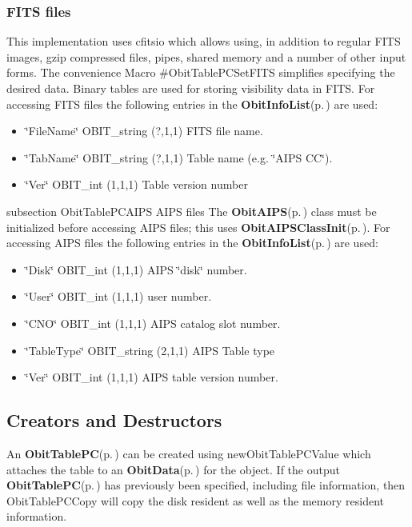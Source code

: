 \subsubsection{FITS files}\label{ObitTableWX_8h_TableFITS}
This implementation uses cfitsio which allows using, in addition to regular FITS images, gzip compressed files, pipes, shared memory and a number of other input forms. The convenience Macro \#Obit\-Table\-PCSet\-FITS simplifies specifying the desired data. Binary tables are used for storing visibility data in FITS. For accessing FITS files the following entries in the {\bf Obit\-Info\-List}{\rm (p.\,\pageref{structObitInfoList})} are used: \begin{itemize}
\item \char`\"{}File\-Name\char`\"{} OBIT\_\-string (?,1,1) FITS file name. \item \char`\"{}Tab\-Name\char`\"{} OBIT\_\-string (?,1,1) Table name (e.g. \char`\"{}AIPS CC\char`\"{}). \item \char`\"{}Ver\char`\"{} OBIT\_\-int (1,1,1) Table version number\end{itemize}
subsection Obit\-Table\-PCAIPS AIPS files The {\bf Obit\-AIPS}{\rm (p.\,\pageref{structObitAIPS})} class must be initialized before accessing AIPS files; this uses {\bf Obit\-AIPSClass\-Init}{\rm (p.\,\pageref{ObitAIPS_8c_a5})}. For accessing AIPS files the following entries in the {\bf Obit\-Info\-List}{\rm (p.\,\pageref{structObitInfoList})} are used: \begin{itemize}
\item \char`\"{}Disk\char`\"{} OBIT\_\-int (1,1,1) AIPS \char`\"{}disk\char`\"{} number. \item \char`\"{}User\char`\"{} OBIT\_\-int (1,1,1) user number. \item \char`\"{}CNO\char`\"{} OBIT\_\-int (1,1,1) AIPS catalog slot number. \item \char`\"{}Table\-Type\char`\"{} OBIT\_\-string (2,1,1) AIPS Table type \item \char`\"{}Ver\char`\"{} OBIT\_\-int (1,1,1) AIPS table version number.\end{itemize}
\subsection{Creators and Destructors}\label{ObitTablePC_8h_ObitTablePCaccess}
An {\bf Obit\-Table\-PC}{\rm (p.\,\pageref{structObitTablePC})} can be created using new\-Obit\-Table\-PCValue which attaches the table to an {\bf Obit\-Data}{\rm (p.\,\pageref{structObitData})} for the object. If the output {\bf Obit\-Table\-PC}{\rm (p.\,\pageref{structObitTablePC})} has previously been specified, including file information, then Obit\-Table\-PCCopy will copy the disk resident as well as the memory resident information.

